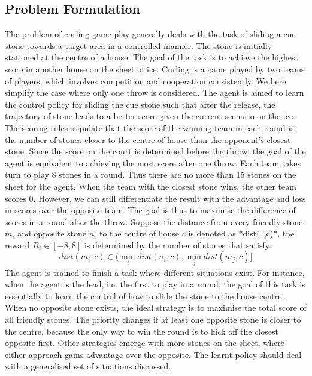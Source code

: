 \documentclass[oneside,11pt,a4paper]{article}
\begin{document}
\subsection{Problem Formulation}
The problem of curling game play generally deals with the task of sliding a cue stone towards a target area in a controlled manner. The stone is initially stationed at the centre of a house. The goal of the task is to achieve the highest score in another house on the sheet of ice. Curling is a game played by two teams of players, which involves competition and cooperation consistently. We here simplify the case where only one throw is considered. The agent is aimed to learn the control policy for sliding the cue stone such that after the release, the trajectory of stone leads to a better score given the current scenario on the ice. The scoring rules stipulate that the score of the winning team in each round is the number of stones closer to the centre of house than the opponent's closest stone. Since the score on the court is determined before the throw, the goal of the agent is equivalent to achieving the most score after one throw. Each team takes turn to play 8 stones in a round. Thus there are no more than 15 stones on the sheet for the agent. When the team with the closest stone wins, the other team scores 0. However, we can still differentiate the result with the advantage and loss in scores over the opposite team. The goal is thus to maximise the difference of scores in a round after the throw. Suppose the distance from every friendly stone $m_i$ and opposite stone $n_i$ to the centre of house $c$ is denoted as *dist(~,c)*, the reward $R_t\in[-8,8]$ is determined by the number of stones that satisfy:
$$
dist(m_i, c) \in (\min_i dist(n_i, c), \min_j dist(m_j, c)]
$$
The agent is trained to finish a task where different situations exist. For instance, when the agent is the lead, i.e. the first to play in a round, the goal of this task is essentially to learn the control of how to slide the stone to the house centre. When no opposite stone exists, the ideal strategy is to maximise the total score of all friendly stones. The priority changes if at least one opposite stone is closer to the centre, because the only way to win the round is to kick off the closest opposite first. Other strategies emerge with more stones on the sheet, where either approach gains advantage over the opposite. The learnt policy should deal with a generalised set of situations discussed.
\newline
\newline
\noindent
\end{document}
